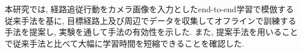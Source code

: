 
本研究では, 経路追従行動をカメラ画像を入力としたend-to-end学習で模倣する従来手法を基に, 目標経路上及び周辺でデータを収集してオフラインで訓練する手法を提案し, 実験を通して手法の有効性を示した. また, 提案手法を用いることで従来手法と比べて大幅に学習時間を短縮できることを確認した.  